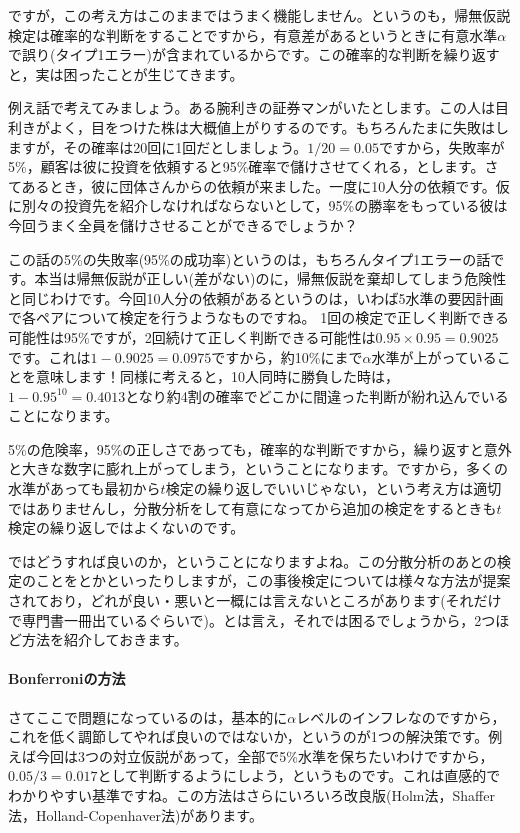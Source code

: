 \documentclass{ltjsarticle}
\begin{document}
ですが，この考え方はこのままではうまく機能しません。というのも，帰無仮説検定は確率的な判断をすることですから，有意差があるというときに有意水準$\alpha$で誤り(タイプ1エラー)が含まれているからです。この確率的な判断を繰り返すと，実は困ったことが生じてきます。

例え話で考えてみましょう。ある腕利きの証券マンがいたとします。この人は目利きがよく，目をつけた株は大概値上がりするのです。もちろんたまに失敗はしますが，その確率は20回に1回だとしましょう。$1/20=0.05$ですから，失敗率が5\%，顧客は彼に投資を依頼すると95\%確率で儲けさせてくれる，とします。さてあるとき，彼に団体さんからの依頼が来ました。一度に10人分の依頼です。仮に別々の投資先を紹介しなければならないとして，95\%の勝率をもっている彼は今回うまく全員を儲けさせることができるでしょうか？

この話の5\%の失敗率(95\%の成功率)というのは，もちろんタイプ1エラーの話です。本当は帰無仮説が正しい(差がない)のに，帰無仮説を棄却してしまう危険性と同じわけです。今回10人分の依頼があるというのは，いわば5水準の要因計画で各ペアについて検定を行うようなものですね。
1回の検定で正しく判断できる可能性は95\%ですが，2回続けて正しく判断できる可能性は$0.95\times0.95=0.9025$です。これは$1-0.9025=0.0975$ですから，約10\%にまで$\alpha$水準が上がっていることを意味します！同様に考えると，10人同時に勝負した時は，$1-0.95^{10}=0.4013$となり約4割の確率でどこかに間違った判断が紛れ込んでいることになります。

5\%の危険率，95\%の正しさであっても，確率的な判断ですから，繰り返すと意外と大きな数字に膨れ上がってしまう，ということになります。ですから，多くの水準があっても最初から$t$検定の繰り返しでいいじゃない，という考え方は適切ではありませんし，分散分析をして有意になってから追加の検定をするときも$t$検定の繰り返しではよくないのです。

ではどうすれば良いのか，ということになりますよね。この分散分析のあとの検定のことをとかといったりしますが，この事後検定については様々な方法が提案されており，どれが良い・悪いと一概には言えないところがあります(それだけで専門書一冊出ているぐらいで\citep{BA33892274})。とは言え，それでは困るでしょうから，2つほど方法を紹介しておきます。

\paragraph{Bonferroniの方法}さてここで問題になっているのは，基本的に$\alpha$レベルのインフレなのですから，これを低く調節してやれば良いのではないか，というのが1つの解決策です。例えば今回は3つの対立仮説があって，全部で5\%水準を保ちたいわけですから，$0.05/3=0.017$として判断するようにしよう，というものです。これは直感的でわかりやすい基準ですね。この方法はさらにいろいろ改良版(Holm法，Shaffer	法，Holland-Copenhaver法)があります。
\end{document}
